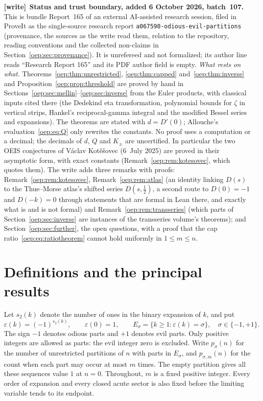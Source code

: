 \documentclass[11pt,letterpaper]{article}
\theoremstyle{remark}\newtheorem{remark}[theorem]{Remark}
\newcommand{\eps}{\varepsilon}
\newcommand{\file}[1]{\nolinkurl{#1}}
\newenvironment{writenote}[1][]{\par\smallskip\begingroup\small
 \noindent\textbf{[write]}\if\relax\detokenize{#1}\relax\else~\textbf{#1.}\fi\ }%
 {\par\endgroup\smallskip}
\begin{document}
\begin{writenote}[Status and trust boundary, added 6 October 2026, batch~107]
This is bundle Report~165 of an external AI-assisted research session,
filed in ProveIt as the single-source research report
\file{a067590-odious-evil-partitions} (provenance, the sources as the write
read them, relation to the repository, reading conventions and the collected
non-claims in Section~\ref{oep:sec:provenance}). It is unrefereed and not
formalized; its author line reads ``Research Report 165'' and its PDF author
field is empty. \emph{What rests on what.} Theorems~\ref{oep:thm:unrestricted},
\ref{oep:thm:capped} and~\ref{oep:thm:inverse} and
Proposition~\ref{oep:prop:threshold} are proved by hand in
Sections~\ref{oep:sec:mellin}--\ref{oep:sec:inverse} from the Euler
products, with classical inputs cited there (the Dedekind eta transformation,
polynomial bounds for $\zeta$ in vertical strips, Hankel's reciprocal-gamma
integral and the modified Bessel series and expansions). The theorems are
stated with $d=D'(0)$; Allouche's evaluation~\eqref{oep:eq:Q} only rewrites
the constants. No proof uses a computation or a decimal; the decimals of $d$,
$Q$ and $K_\pm$ are uncertified. In particular the two OEIS conjectures of
V\'aclav Kot\v e\v sovec (6~July 2025) are proved in their asymptotic form,
with exact constants (Remark~\ref{oep:rem:kotesovec}, which quotes them). The
write adds three remarks with proofs: Remark~\ref{oep:rem:kotesovec},
Remark~\ref{oep:rem:atlas} (an identity linking $D(s)$ to the Thue--Morse
atlas's shifted series $D(s,\tfrac12)$, a second route to $D(0)=-1$ and
$D(-k)=0$ through statements that are formal in Lean there, and exactly what
is and is not formal) and Remark~\ref{oep:rem:transseries} (which parts of
Section~\ref{oep:sec:inverse} are instances of the transseries volume's
theorems); and Section~\ref{oep:sec:further}, the open questions, with a proof
that the cap ratio~\eqref{oep:eq:ratiotheorem} cannot hold uniformly in
$1\le m\le n$.
\end{writenote}
\tableofcontents

\section{Definitions and the principal results}
Let $s_2(k)$ denote the number of ones in the binary expansion of $k$, and put
\[
 \eps(k)=(-1)^{s_2(k)},\qquad \eps(0)=1,
 \qquad E_\sigma=\{k\geq1:\eps(k)=\sigma\},\quad \sigma\in\{-1,+1\}.
\]
The sign $-1$ denotes odious parts and $+1$ denotes evil parts. Only positive integers are allowed as parts: the evil integer zero is excluded. Write $p_\sigma(n)$ for the number of unrestricted partitions of $n$ with parts in $E_\sigma$, and $p_{\sigma,m}(n)$ for the count when each part may occur at most $m$ times. The empty partition gives all these sequences value $1$ at $n=0$. Throughout, $m$ is a fixed positive integer. Every order of expansion and every closed acute sector is also fixed before the limiting variable tends to its endpoint.
\end{document}
